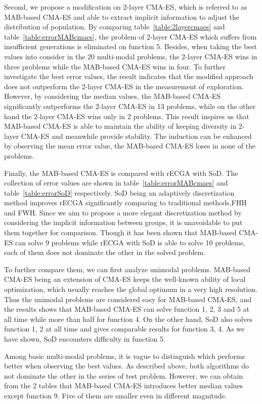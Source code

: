 Second, we propose a modification on 2-layer CMA-ES, which is referred
to as MAB-based CMA-ES and able to extract implicit information to
adjust the distribution of population.
By comparing table~\ref{table:2layercmaes} and
table~\ref{table:errorMABcmaes}, the problem of 2-layer CMA-ES which
suffers from insufficient generations is eliminated on function 5.
Besides, when taking the best values into consider in the 20 multi-modal
problems, the 2-layer CMA-ES wins in three problems while the MAB-based
CMA-ES wins in four.
To further investigate the best error values, the result indicates that
the modified approach does not outperform the 2-layer CMA-ES in the
measurement of exploration.
However, by considering the median values, the MAB-based CMA-ES
significantly outperforms the 2-layer CMA-ES in 13 problems, while on the
other hand the 2-layer CMA-ES wins only in 2 problems.
This result inspires us that MAB-based CMA-ES is able to maintain the
ability of keeping diversity in 2-layer CMA-ES and meanwhile provide
stability.
The induction can be enhanced by observing the mean error value, the
MAB-based CMA-ES loses in none of the problems.

Finally, the MAB-based CMA-ES is compared with rECGA with SoD.
The collection of error values are shown in
table~\ref{table:errorMABcmaes} and table~\ref{table:errorSoD}
respectively.
SoD being an adaptively discretization method improves rECGA
significantly comparing to traditional methods,FHH and FWH.
Since we aim to propose a more elegant discretization method by
considering the implicit information between groups, it is unavoidable
to put them together for comparison.
Though it has been shown that MAB-based CMA-ES can solve 9 problems while rECGA
with SoD is able to solve 10 problems, each of them does not dominate
the other in the solved problem.

To further compare them, we can first analyze unimodal problems.
MAB-based CMA-ES being an extension of CMA-ES keeps the well-known ability of local
optimization, which usually reaches the global optimum in a very high resolution.
Thus the unimodal problems are considered easy for MAB-based CMA-ES, and
the results shows that MAB-based CMA-ES can solve function 1, 2, 3 and 5 at
all time while more than half for function 4.
On the other hand, SoD also solves function 1, 2 at all time and gives
comparable results for function 3, 4.
As we have shown, SoD encounters difficulty in function 5.

Among basic multi-modal problems, it is vague to distinguish which
performs better when observing the best values.
As described above, both algorithms do not dominate the other in the
series of test problem.
However, we can obtain from the 2 tables that MAB-based CMA-ES
introduces better median values except function 9. 
Five of them are smaller even in different magnitude.

